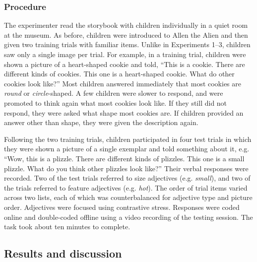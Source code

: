\documentclass[man]{apa2}
\begin{document}
\subsubsection{Procedure}

The experimenter read the storybook with children individually in a quiet room at the museum. As before, children were introduced to Allen the Alien and then given two training trials with familiar items. Unlike in  Experiments 1--3, children saw only a single image per trial. For example, in a training trial, children were shown a picture of a heart-shaped cookie and told, ``This is a cookie.  There are different kinds of cookies.  This one is a heart-shaped cookie.  What do other cookies look like?'' Most children answered immediately that most cookies are \emph{round} or \emph{circle}-shaped. A few children were slower to respond, and were promoted to think again what most cookies look like. If they still did not respond, they were asked what shape most cookies are.  If children provided an answer other than shape, they were given the description again.

Following the two training trials, children participated in four test trials in which they were shown a picture of a single exemplar and told something about it, e.g. ``Wow, this is a plizzle. There are different kinds of plizzles. This one is a small plizzle.  What do you think other plizzles look like?'' Their verbal responses were recorded.  Two of the test trials referred to size adjectives (e.g. \emph{small}), and two of the trials referred to feature adjectives (e.g. \emph{hot}).  The order of trial items varied across two lists, each of which was counterbalanced for adjective type and picture order.  Adjectives were focused using contrastive stress. Responses were coded online and double-coded offline using a video recording of the testing session.  The task took about ten minutes to complete. 

\subsection{Results and discussion}
\end{document}
